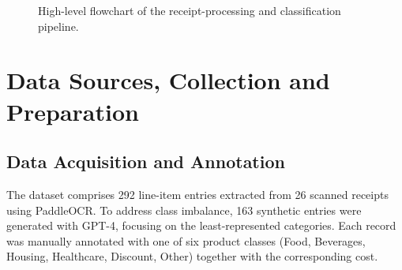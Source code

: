 \documentclass{SGGW-thesis-EN}
\begin{document}
\begin{figure}[h]
  \centering
  \caption{High-level flowchart of the receipt-processing and classification pipeline.}
  \label{fig:pipeline_flowchart_vertical}
\end{figure}



\section{Data Sources, Collection and Preparation}

\subsection{Data Acquisition and Annotation}
The dataset comprises 292 line-item entries extracted from 26 scanned receipts using PaddleOCR.
To address class imbalance, 163 synthetic entries were generated with GPT-4, focusing on the least-represented categories. 
Each record was manually annotated with one of six product classes (Food, Beverages, Housing, Healthcare, Discount, Other) together
with the corresponding cost.
\end{document}

